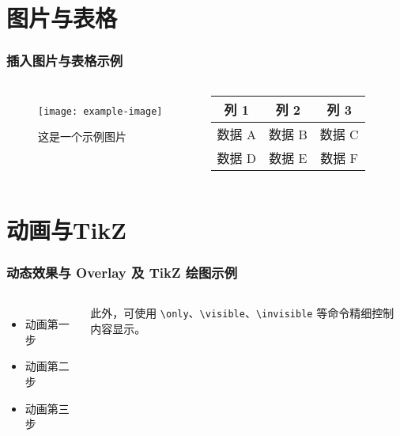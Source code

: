 \documentclass[10pt,aspectratio=169,mathserif]{beamer}
\begin{document}
\section{图片与表格}
\begin{frame}
    \frametitle{插入图片与表格示例}
    \begin{columns}[T] %
            \begin{figure}
                \centering
                \texttt{[image: example-image]} %
                \caption{这是一个示例图片}
            \end{figure}
            \begin{center}
            \begin{tabular}{|c|c|c|}
                \hline
                列 1 & 列 2 & 列 3 \\
                \hline
                数据 A & 数据 B & 数据 C \\
                \hline
                数据 D & 数据 E & 数据 F \\
                \hline
            \end{tabular}
            \end{center}
    \end{columns}
\end{frame}

\section{动画与TikZ}
\begin{frame}[fragile]
    \frametitle{动态效果与 Overlay 及 TikZ 绘图示例}
    \begin{columns}[T] %
        \begin{itemize}
            \item 动画第一步
            \item 动画第二步
            \item 动画第三步
        \end{itemize}
        此外，可使用 \verb|\only|、\verb|\visible|、\verb|\invisible| 等命令精细控制内容显示。
        
    \end{columns}
\end{frame}
\end{document}
